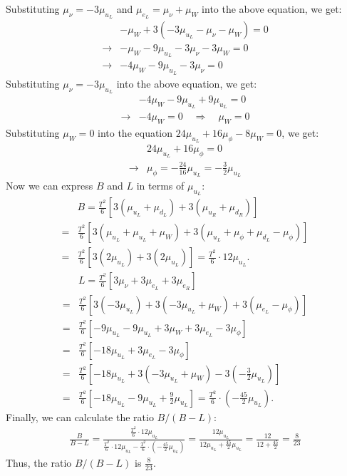 Substituting $\mu_{\nu} = -3\mu_{u_L}$ and $\mu_{e_L} = \mu_{\nu} + \mu_W$ into the above equation, we get:
\begin{align}
    &- \mu_W + 3(-3\mu_{u_L} - \mu_{\nu} - \mu_W) = 0\\
    \to &- \mu_W - 9\mu_{u_L} - 3\mu_{\nu} - 3\mu_W = 0\\
    \to &- 4\mu_W - 9\mu_{u_L} - 3\mu_{\nu} = 0
\end{align}
Substituting $\mu_{\nu} = -3\mu_{u_L}$ into the above equation, we get:
\begin{align}
    &- 4\mu_W - 9\mu_{u_L} + 9\mu_{u_L} = 0\\
    \to &- 4\mu_W = 0 \quad \Rightarrow \quad \mu_W = 0
\end{align}
Substituting $\mu_W = 0$ into the equation $24\mu_{u_L} + 16\mu_\phi - 8\mu_W = 0$, we get:
\begin{align}
    &24\mu_{u_L} + 16\mu_\phi = 0\\
    \to &\mu_\phi = -\frac{24}{16}\mu_{u_L} = -\frac{3}{2}\mu_{u_L}
\end{align}
Now we can express $B$ and $L$ in terms of $\mu_{u_L}$:
\begin{align}
    &B = \frac{T^2}{6} \left[ 3(\mu_{u_L} + \mu_{d_L}) + 3(\mu_{u_R} + \mu_{d_R})  \right] \\
    = & \frac{T^2}{6} \left[ 3(\mu_{u_L} + \mu_{u_L} + \mu_W) + 3(\mu_{u_L} + \mu_\phi + \mu_{d_L} - \mu_\phi)  \right] \\
    =& \frac{T^2}{6} \left[ 3(2\mu_{u_L}) + 3(2\mu_{u_L})  \right] = \frac{T^2}{6} \cdot 12\mu_{u_L}.
\end{align}
\begin{align}
    &L = \frac{T^2}{6} \left[ 3\mu_{\nu} + 3\mu_{e_L} + 3\mu_{e_R} \right] \\
    =& \frac{T^2}{6} \left[ 3(-3\mu_{u_L}) + 3(-3\mu_{u_L} + \mu_W) + 3(\mu_{e_L} - \mu_\phi) \right] \\
    =& \frac{T^2}{6} \left[ -9\mu_{u_L} - 9\mu_{u_L} + 3\mu_W + 3\mu_{e_L} - 3\mu_\phi \right] \\
    =& \frac{T^2}{6} \left[ -18\mu_{u_L} + 3\mu_{e_L} - 3\mu_\phi \right] \\
    =& \frac{T^2}{6} \left[ -18\mu_{u_L} + 3(-3\mu_{u_L} + \mu_W) - 3(-\frac{3}{2}\mu_{u_L}) \right] \\
    =& \frac{T^2}{6} \left[ -18\mu_{u_L} - 9\mu_{u_L} + \frac{9}{2}\mu_{u_L} \right] = \frac{T^2}{6} \cdot \left( -\frac{45}{2}\mu_{u_L} \right).
\end{align}
Finally, we can calculate the ratio $B/(B-L)$:
\begin{align}
    \frac{B}{B-L} = \frac{\frac{T^2}{6} \cdot 12\mu_{u_L}}{\frac{T^2}{6} \cdot 12\mu_{u_L} - \frac{T^2}{6} \cdot \left( -\frac{45}{2}\mu_{u_L} \right)} = \frac{12\mu_{u_L}}{12\mu_{u_L} + \frac{45}{2}\mu_{u_L}} = \frac{12}{12 + \frac{45}{2}} = \frac{8}{23}
\end{align}
Thus, the ratio $B/(B-L)$ is $\frac{8}{23}$.